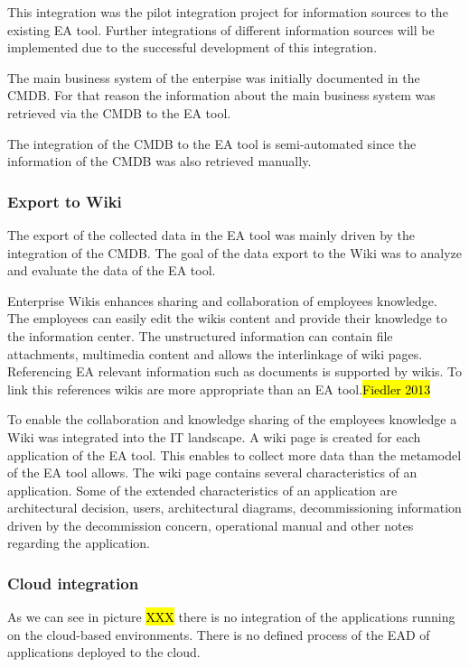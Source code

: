 This integration was the pilot integration project for information sources to the existing EA tool. Further integrations of different information sources will be implemented due to the successful development of this integration.

The main business system of the enterpise was initially documented in the CMDB. For that reason the information about the main business system was retrieved via the CMDB to the EA tool.

The integration of the CMDB to the EA tool is semi-automated since the information of the CMDB was also retrieved manually.

\subsubsection{Export to Wiki}

The export of the collected data in the EA tool was mainly driven by the integration of the CMDB. The goal of the data export to the Wiki was to analyze and evaluate the data of the EA tool. 

Enterprise Wikis enhances sharing and collaboration of employees knowledge. The employees can easily edit the wikis content and provide their knowledge to the information center. The unstructured information can contain file attachments, multimedia content and allows the interlinkage of wiki pages. Referencing EA relevant information such as documents is supported by wikis. To link this references wikis are more appropriate than an EA tool.\hl{Fiedler 2013}

To enable the collaboration and knowledge sharing of the employees knowledge a Wiki was integrated into the IT landscape. A wiki page is created for each application of the EA tool. This enables to collect more data than the metamodel of the EA tool allows. The wiki page contains several characteristics of an application. Some of the extended characteristics of an application are architectural decision, users, architectural diagrams, decommissioning information driven by the decommission concern, operational manual and other notes regarding the application.

\subsubsection{Cloud integration}

As we can see in picture \hl{XXX} there is no integration of the applications running on the cloud-based environments. There is no defined process of the EAD of applications deployed to the cloud.

